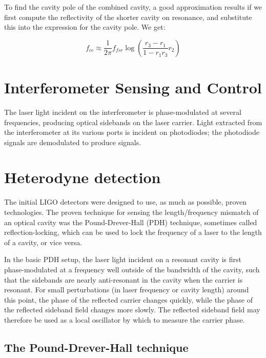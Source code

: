 To find the cavity pole of the combined cavity, a good approximation
results if we first compute the reflectivity of the shorter cavity on
resonance, and substitute this into the expression for the cavity pole.
We get:

\begin{equation}
f_{cc} \approx \frac{1}{2\pi} f_{fsr} \log \left(\frac{r_3 - r_1}{1 - r_1 r_3} r_2\right)
\end{equation}



\section{Interferometer Sensing and Control}
\label{sec:isc}
The laser light incident on the interferometer is phase-modulated at
several frequencies, producing optical sidebands on the laser carrier.
Light extracted from the interferometer at its various ports is
incident on photodiodes; the photodiode signals are demodulated to
produce signals.

\cite{Fritschel2001Readout}


\section{Heterodyne detection}

The initial LIGO detectors were designed to use, as much as possible,
proven technologies.  The proven technique for sensing the
length/frequency mismatch of an optical cavity was the
Pound-Drever-Hall (PDH)
technique\cite{Drever1983Laser,Black2001Introduction}, sometimes
called reflection-locking, which can be used to lock the frequency of
a laser to the length of a cavity, or vice versa.

In the basic PDH setup, the laser light incident on a resonant cavity
is first phase-modulated at a frequency well outside of the bandwidth
of the cavity, such that the sidebands are nearly anti-resonant in the
cavity when the carrier is resonant.  For small perturbations (in
laser frequency or cavity length) around this point, the phase of the
reflected carrier changes quickly, while the phase of the reflected
sideband field changes more slowly.  The reflected sideband field may
therefore be used as a local oscillator by which to measure the
carrier phase.

\subsection{The Pound-Drever-Hall technique}

